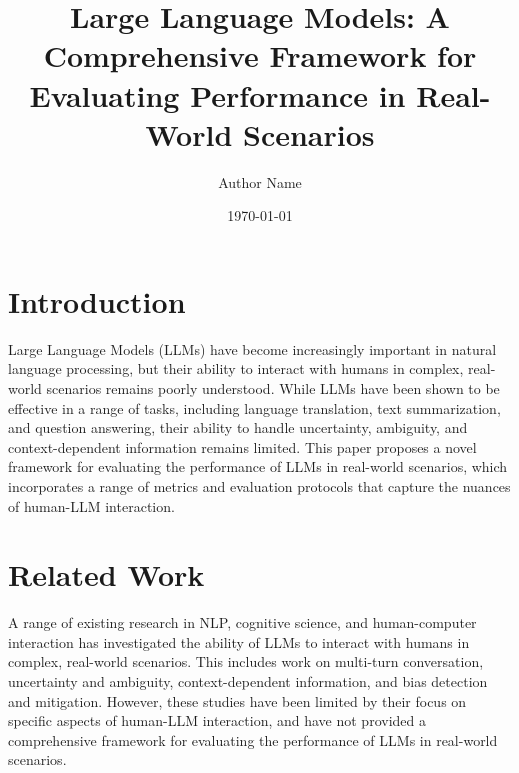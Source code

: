 \documentclass{article}
\title{Large Language Models: A Comprehensive Framework for Evaluating Performance in Real-World Scenarios}
\author{Author Name}
\date{\today}
\begin{document}
\maketitle


\section{Introduction}

Large Language Models (LLMs) have become increasingly important in natural language processing, but their ability to interact with humans in complex, real-world scenarios remains poorly understood. While LLMs have been shown to be effective in a range of tasks, including language translation, text summarization, and question answering, their ability to handle uncertainty, ambiguity, and context-dependent information remains limited. This paper proposes a novel framework for evaluating the performance of LLMs in real-world scenarios, which incorporates a range of metrics and evaluation protocols that capture the nuances of human-LLM interaction.

\section{Related Work}

A range of existing research in NLP, cognitive science, and human-computer interaction has investigated the ability of LLMs to interact with humans in complex, real-world scenarios. This includes work on multi-turn conversation, uncertainty and ambiguity, context-dependent information, and bias detection and mitigation. However, these studies have been limited by their focus on specific aspects of human-LLM interaction, and have not provided a comprehensive framework for evaluating the performance of LLMs in real-world scenarios.
\end{document}
